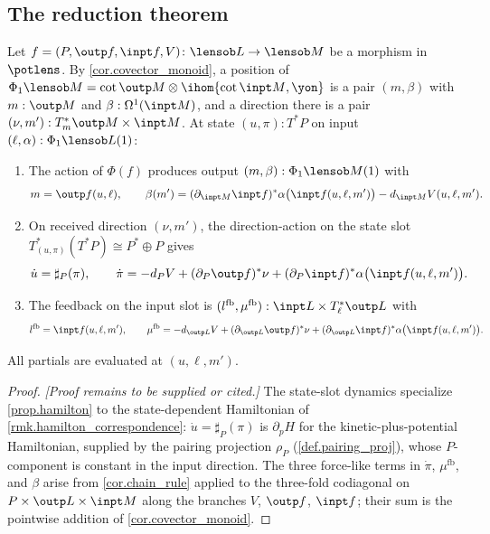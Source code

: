 \subsection{The reduction theorem}\label{sec.reduction}

\begin{theorem}[Reduction]\label{thm.reduction}
Let $f=(P,\outp f,\inpt f,V)\colon\lensob L\to\lensob M$ be a morphism in $\potlens$. By \cref{cor.covector_monoid}, a position of $\Phi_1\lensob M=\cot{\outp M}\otimes\ihom{\cot{\inpt M},\yon}$ is a pair $(m,\beta)$ with $m:\outp M$ and $\beta:\Omega^1(\inpt M)$, and a direction there is a pair $(\nu,m'): T^*_m\outp M\times\inpt M$. At state $(u,\pi): T^*P$ on input $(\ell,\alpha):\Phi_1\lensob L(1)$:
\begin{enumerate}
\item The action of $\Phi(f)$ produces output $(m,\beta):\Phi_1\lensob M(1)$ with
\[
m = \outp f(u,\ell),
\qquad
\beta(m') = (\partial_{\inpt M}\inpt f)^*\alpha\bigl(\inpt f(u,\ell,m')\bigr) - d_{\inpt M}V(u,\ell,m').
\]
\item On received direction $(\nu,m')$, the direction-action on the state slot $T^*_{(u,\pi)}(T^*P)\cong P^*\oplus P$ gives
\[
\dot u = \sharp_P(\pi),
\qquad
\dot\pi = -d_PV + (\partial_P\outp f)^*\nu + (\partial_P\inpt f)^*\alpha\bigl(\inpt f(u,\ell,m')\bigr).
\]
\item The feedback on the input slot is $(l^\mathrm{fb},\mu^\mathrm{fb}):\inpt L\times T^*_\ell\outp L$ with
\[
l^\mathrm{fb} = \inpt f(u,\ell,m'),
\qquad
\mu^\mathrm{fb} = -d_{\outp L}V + (\partial_{\outp L}\outp f)^*\nu + (\partial_{\outp L}\inpt f)^*\alpha\bigl(\inpt f(u,\ell,m')\bigr).
\]
\end{enumerate}
All partials are evaluated at $(u,\ell,m')$.
\end{theorem}

\begin{proof}
\emph{[Proof remains to be supplied or cited.]} The state-slot dynamics specialize \cref{prop.hamilton} to the state-dependent Hamiltonian of \cref{rmk.hamilton_correspondence}: $\dot u=\sharp_P(\pi)$ is $\partial_p H$ for the kinetic-plus-potential Hamiltonian, supplied by the pairing projection $\rho_P$ (\cref{def.pairing_proj}), whose $P$-component is constant in the input direction. The three force-like terms in $\dot\pi$, $\mu^\mathrm{fb}$, and $\beta$ arise from \cref{cor.chain_rule} applied to the three-fold codiagonal on $P\times\outp L\times\inpt M$ along the branches $V$, $\outp f$, $\inpt f$; their sum is the pointwise addition of \cref{cor.covector_monoid}.
\end{proof}

